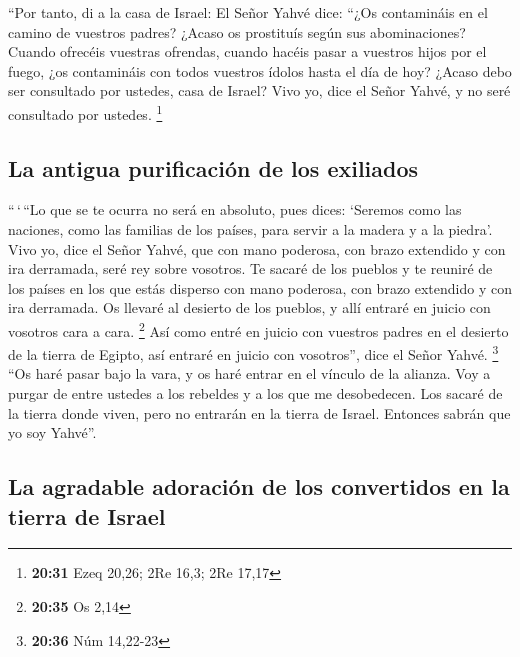 \begin{paracol}{2}
 ``Por tanto, di a la casa de Israel: El Señor Yahvé
dice: ``¿Os contamináis en el camino de vuestros padres? ¿Acaso os
prostituís según sus abominaciones?  Cuando ofrecéis
vuestras ofrendas, cuando hacéis pasar a vuestros hijos por el fuego,
¿os contamináis con todos vuestros ídolos hasta el día de hoy? ¿Acaso
debo ser consultado por ustedes, casa de Israel? Vivo yo, dice el Señor
Yahvé, y no seré consultado por ustedes. \footnote{\textbf{20:31} Ezeq
  20,26; 2Re 16,3; 2Re 17,17}

\hypertarget{la-antigua-purificaciuxf3n-de-los-exiliados}{%
\subsection{La antigua purificación de los
exiliados}\label{la-antigua-purificaciuxf3n-de-los-exiliados}}

 ``\,`\,``Lo que se te ocurra no será en absoluto, pues
dices: `Seremos como las naciones, como las familias de los países, para
servir a la madera y a la piedra'.  Vivo yo, dice el
Señor Yahvé, que con mano poderosa, con brazo extendido y con ira
derramada, seré rey sobre vosotros.  Te sacaré de los
pueblos y te reuniré de los países en los que estás disperso con mano
poderosa, con brazo extendido y con ira derramada.  Os
llevaré al desierto de los pueblos, y allí entraré en juicio con
vosotros cara a cara. \footnote{\textbf{20:35} Os 2,14} 
Así como entré en juicio con vuestros padres en el desierto de la tierra
de Egipto, así entraré en juicio con vosotros'', dice el Señor Yahvé.
\footnote{\textbf{20:36} Núm 14,22-23}  ``Os haré pasar
bajo la vara, y os haré entrar en el vínculo de la alianza.
 Voy a purgar de entre ustedes a los rebeldes y a los que
me desobedecen. Los sacaré de la tierra donde viven, pero no entrarán en
la tierra de Israel. Entonces sabrán que yo soy Yahvé''.

\hypertarget{la-agradable-adoraciuxf3n-de-los-convertidos-en-la-tierra-de-israel}{%
\subsection{La agradable adoración de los convertidos en la tierra de
Israel}\label{la-agradable-adoraciuxf3n-de-los-convertidos-en-la-tierra-de-israel}}


\end{paracol}
